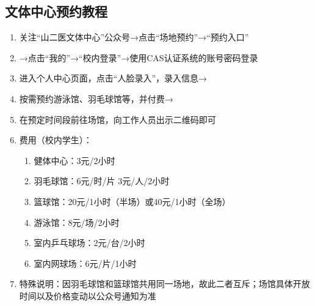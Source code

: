 \subsection[文体中心预约教程]{文体中心预约教程}
\label{sports_center_book}
\begin{enumerate}
    \item 关注“山二医文体中心”公众号→点击“场地预约”→“预约入口”
    \item →点击“我的”→“校内登录”→使用CAS认证系统的账号密码登录
    \item 进入个人中心页面，点击“人脸录入”，录入信息→
    \item 按需预约游泳馆、羽毛球馆等，并付费→
    \item 在预定时间段\footnotemark 前往场馆，向工作人员出示二维码即可
    \item 费用（校内学生）：
          \begin{enumerate}
              \item 健体中心：3元/2小时
              \item 羽毛球馆\footnotemark：6元/时/片 3元/人/2小时
              \item 篮球馆：20元/1小时（半场）或40元/1小时（全场）
              \item 游泳馆\footnotemark：8元/场/2小时
              \item 室内乒乓球场：2元/台/2小时
              \item 室内网球场：6元/片/1小时
          \end{enumerate}
    \item 特殊说明：因羽毛球馆和篮球馆共用同一场地，故此二者互斥；场馆具体开放时间以及价格变动以公众号通知为准
\end{enumerate}
